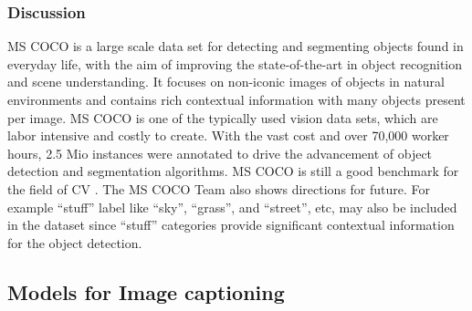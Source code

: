 \documentclass[
]{krantz}
\begin{document}
\hypertarget{discussion}{%
\subsubsection{Discussion}\label{discussion}}

MS COCO is a large scale data set for detecting and segmenting objects found in everyday life, with the aim of improving the state-of-the-art in object recognition and scene understanding. It focuses on non-iconic images of objects in natural environments and contains rich contextual information with many objects present per image. MS COCO is one of the typically used vision data sets, which are labor intensive and costly to create.
With the vast cost and over 70,000 worker hours, 2.5 Mio instances were annotated to drive the advancement of object detection and segmentation algorithms. MS COCO is still a good benchmark for the field of CV \citep{mccoco}.
The MS COCO Team also shows directions for future. For example ``stuff'' label like ``sky'', ``grass'', and ``street'', etc, may also be included in the dataset since ``stuff'' categories provide significant contextual information for the object detection.

\hypertarget{models-for-image-captioning}{%
\subsection{Models for Image captioning}\label{models-for-image-captioning}}
\end{document}
